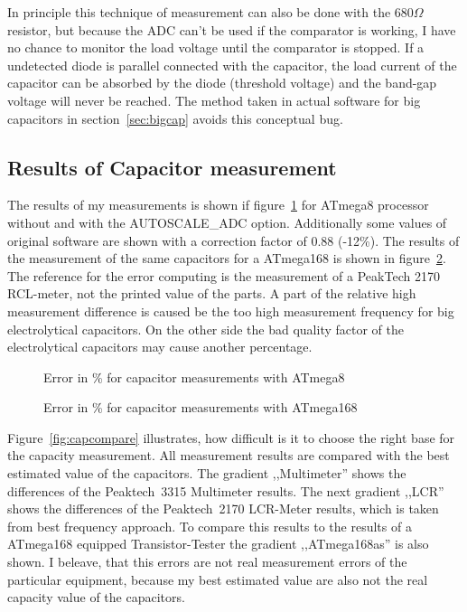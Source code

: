 In principle this technique of measurement can also be done with the \(680\Omega\) resistor, but 
because the ADC can't be used if the comparator is working, I have no chance to monitor the
load voltage until the comparator is stopped. If a undetected diode is parallel connected with
the capacitor, the load current of the capacitor can be absorbed by the diode (threshold voltage) and
the band-gap voltage will never be reached.
The method taken in actual software for big capacitors in section~\ref{sec:bigcap}
avoids this conceptual bug.

\subsection{Results of Capacitor measurement}
The results of my measurements is shown if figure~\ref{fig:mega8cap} for ATmega8 processor without and 
with the AUTOSCALE\_ADC option. Additionally some values of original software are shown with a correction factor
of 0.88 (-12\%).
The results of the measurement of the same capacitors for a ATmega168 is shown in figure~\ref{fig:mega168cap}.
The reference for the error computing is the measurement of a PeakTech 2170 RCL-meter, not the printed value
of the parts.
A part of the relative high measurement difference is caused be the too high measurement frequency for big
electrolytical capacitors. On the other side the bad quality factor of the electrolytical capacitors may cause
another percentage.

\begin{figure}[H]
\centering

\caption{Error in \% for capacitor measurements with ATmega8 }
\label{fig:mega8cap}
\end{figure}

\begin{figure}[H]
\centering

\caption{Error in \% for capacitor measurements with ATmega168 }
\label{fig:mega168cap}
\end{figure}

Figure~\ref{fig:capcompare} illustrates, how difficult is it to choose the right base for the capacity measurement.
All measurement results are compared with the best estimated value of the capacitors.
The gradient ,,Multimeter'' shows the differences of the Peaktech~3315 Multimeter results.
The next gradient ,,LCR'' shows the differences of the Peaktech~2170 LCR-Meter results, which is taken from best frequency approach.
To compare this results to the results of a ATmega168 equipped Transistor-Tester the gradient ,,ATmega168as'' is also shown.
I beleave, that this errors are not real measurement errors of the particular equipment, because my best estimated value are
also not the real capacity value of the capacitors.

